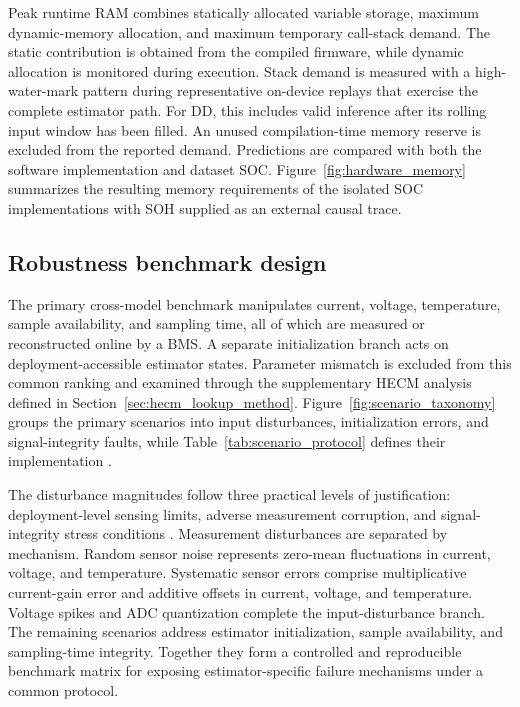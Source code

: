 \documentclass[review,nopreprintline]{elsarticle}
\begin{document}
Peak runtime RAM combines statically allocated variable storage, maximum dynamic-memory allocation, and maximum temporary call-stack demand. The static contribution is obtained from the compiled firmware, while dynamic allocation is monitored during execution. Stack demand is measured with a high-water-mark pattern during representative on-device replays that exercise the complete estimator path. For DD, this includes valid inference after its rolling input window has been filled. An unused compilation-time memory reserve is excluded from the reported demand. Predictions are compared with both the software implementation and dataset SOC. Figure~\ref{fig:hardware_memory} summarizes the resulting memory requirements of the isolated SOC implementations with SOH supplied as an external causal trace.

\subsection{Robustness benchmark design}
The primary cross-model benchmark manipulates current, voltage, temperature, sample availability, and sampling time, all of which are measured or reconstructed online by a BMS. A separate initialization branch acts on deployment-accessible estimator states. Parameter mismatch is excluded from this common ranking and examined through the supplementary HECM analysis defined in Section~\ref{sec:hecm_lookup_method}. Figure~\ref{fig:scenario_taxonomy} groups the primary scenarios into input disturbances, initialization errors, and signal-integrity faults, while Table~\ref{tab:scenario_protocol} defines their implementation \cite{bergerBenchmarkingBatteryManagement2024}.

The disturbance magnitudes follow three practical levels of justification: deployment-level sensing limits, adverse measurement corruption, and signal-integrity stress conditions \cite{BQ7961616SeriesBattery2023,DesignConsiderationsCurrent,TMCS11083Functional,TLE4972HighPrecision,aielloElectromagneticSusceptibilityBattery2020,liuAssessingImpactSampling2025}. Measurement disturbances are separated by mechanism. Random sensor noise represents zero-mean fluctuations in current, voltage, and temperature. Systematic sensor errors comprise multiplicative current-gain error and additive offsets in current, voltage, and temperature. Voltage spikes and ADC quantization complete the input-disturbance branch. The remaining scenarios address estimator initialization, sample availability, and sampling-time integrity. Together they form a controlled and reproducible benchmark matrix for exposing estimator-specific failure mechanisms under a common protocol.
\end{document}

